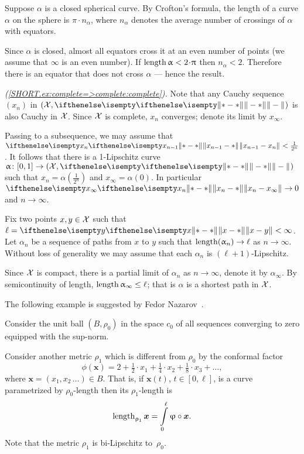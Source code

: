 Suppose $\alpha$ is a closed spherical curve. 
By Crofton's formula, the length of a curve $\alpha$ on the sphere is $\pi\cdot n_\alpha$, where $n_\alpha$ denotes the average number of crossings of $\alpha$ with equators.

Since $\alpha$ is closed, almost all equators cross it at an even number of points (we assume that $\infty$ is an even number).
If $\length \alpha<2\cdot\pi$ then $n_\alpha<2$.
Therefore there is an equator that does not cross $\alpha$ --- hence the result.


\textit{(\ref{SHORT.ex:complete=>complete:complete}).}
Note that any Cauchy sequence $(x_n)$ in $(\spc{X},\yetdist{}{}{})$ is also Cauchy in $\mathcal{X}$.
Since $\mathcal{X}$ is complete, $x_n$ converges; denote its limit by $x_\infty$.

Passing to a subsequence, we may assume that $\yetdist{x_{n-1}}{x_n}{}<\tfrac1{2^n}$.
It follows that there is a 1-Lipschitz curve $\alpha\:[0,1]\to (\spc{X},\yetdist{}{}{})$ such that $x_n=\alpha(\tfrac1{2^n})$ and $x_\infty=\alpha(0)$.
In particular $\yetdist{x_n}{x_\infty}{}\to0$ and $n\to\infty$.

Fix two points $x,y\in\spc{X}$ such that $\ell=\yetdist{x}{y}{}<\infty$.
Let $\alpha_n$ be a sequence of paths from $x$ to $y$ such that $\length(\alpha_n)\to\ell$ as $n\to \infty$.
Without loss of generality we may assume that each $\alpha_n$ is $(\ell+1)$-Lipschitz.

Since $\mathcal{X}$ is compact, there is a partial limit of $\alpha_n$ as $n\to \infty$,
denote it by $\alpha_\infty$.
By semicontinuity of length, $\length\alpha_\infty\le\ell$;
that is $\alpha$ is a shortest path in $\mathcal{X}$.

The following example is suggested by Fedor Nazarov~\cite{nazarov}.

\medskip

Consider the unit ball $(B,\rho_0)$
in the space $c_0$ of all sequences converging to zero equipped with the sup-norm.

Consider another metric $\rho_1$ which is different from $\rho_0$ by the conformal factor
\[\phi(\bm{x})=2+\tfrac{1}2\cdot x_1+\tfrac{1}4\cdot x_2+\tfrac{1}8\cdot x_3+\dots,\]
where $\bm{x}=(x_1,x_2\,\dots)\in B$.
That is, if $\bm{x}(t)$, $t\in[0,\ell]$, is a curve parametrized by $\rho_0$-length 
then its $\rho_1$-length is 
\[\length_{\rho_1}\bm{x}=\int\limits_0^\ell\phi\circ\bm{x}.\]
Note that the metric $\rho_1$ is bi-Lipschitz to~$\rho_0$.


